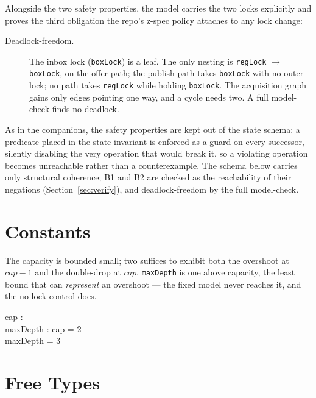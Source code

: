 \documentclass[a4paper,10pt,fleqn]{article}
\begin{document}
Alongside the two safety properties, the model carries the two locks explicitly
and proves the third obligation the repo's z-spec policy attaches to any lock
change:

\begin{description}
  \item[Deadlock-freedom.] The inbox lock (\texttt{boxLock}) is a leaf. The only
    nesting is \texttt{regLock} $\to$ \texttt{boxLock}, on the offer path; the
    publish path takes \texttt{boxLock} with no outer lock; no path takes
    \texttt{regLock} while holding \texttt{boxLock}. The acquisition graph gains
    only edges pointing one way, and a cycle needs two. A full model-check finds
    no deadlock.
\end{description}

As in the companions, the safety properties are kept out of the state schema:
a predicate placed in the state invariant is enforced as a guard on every
successor, silently disabling the very operation that would break it, so a
violating operation becomes unreachable rather than a counterexample. The schema
below carries only structural coherence; B1 and B2 are checked as the
reachability of their negations (Section~\ref{sec:verify}), and deadlock-freedom
by the full model-check.

\section{Constants}

The capacity is bounded small; two suffices to exhibit both the overshoot at
$cap - 1$ and the double-drop at $cap$. \texttt{maxDepth} is one above capacity,
the least bound that can \emph{represent} an overshoot --- the fixed model never
reaches it, and the no-lock control does.

\begin{axdef}
  cap : \nat \\
  maxDepth : \nat
\where
  cap = 2 \\
  maxDepth = 3
\end{axdef}

\section{Free Types}
\end{document}
